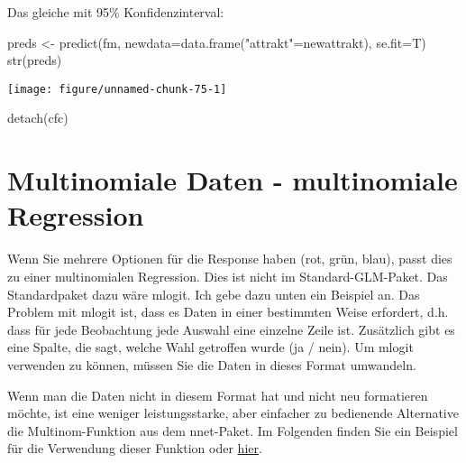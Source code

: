 \documentclass[a4paper,twoside]{tufte-book}\usepackage[]{graphicx}\usepackage[]{color}
\makeatletter
\def\maxwidth{ %
	\ifdim\Gin@nat@width>\linewidth
	\linewidth
	\else
	\Gin@nat@width
	\fi
}
\makeatother
\begin{document}
\begin{appendices}
Das gleiche mit 95\% Konfidenzinterval:

\begin{Schunk}
\begin{Sinput}
preds <- predict(fm, newdata=data.frame("attrakt"=newattrakt), se.fit=T)
str(preds)
\end{Sinput}

\texttt{[image: figure/unnamed-chunk-75-1]} \begin{Sinput}
detach(cfc)
\end{Sinput}
\end{Schunk}



\section{Multinomiale Daten - multinomiale Regression}

Wenn Sie mehrere Optionen für die Response haben (rot, grün, blau), passt dies zu einer multinomialen Regression. Dies ist nicht im Standard-GLM-Paket. Das Standardpaket dazu wäre mlogit. Ich gebe dazu unten ein Beispiel an. Das Problem mit mlogit ist, dass es Daten in einer bestimmten Weise erfordert, d.h. dass für jede Beobachtung jede Auswahl eine einzelne Zeile ist. Zusätzlich gibt es eine Spalte, die sagt, welche Wahl getroffen wurde (ja / nein). Um mlogit verwenden zu können, müssen Sie die Daten in dieses Format umwandeln.

Wenn man die Daten nicht in diesem Format hat und nicht neu formatieren möchte, ist eine weniger leistungsstarke, aber einfacher zu bedienende Alternative die Multinom-Funktion aus dem nnet-Paket. Im Folgenden finden Sie ein Beispiel für die Verwendung dieser Funktion oder \href{http://www.ats.ucla.edu/stat/stata/dae/mlogit.htm}{hier}.


\end{appendices}
\end{document}
